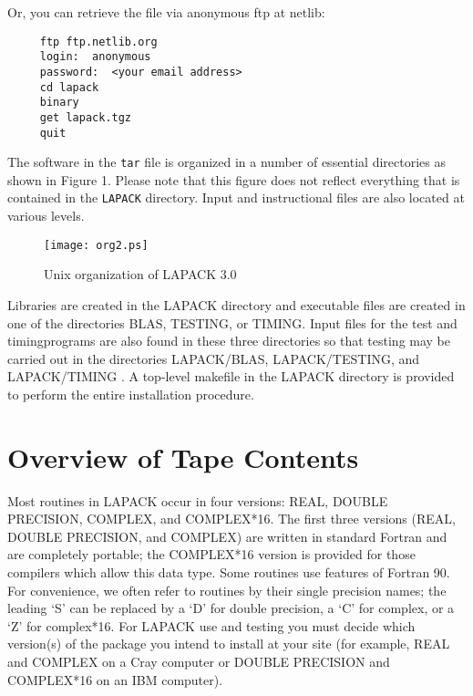 \documentclass[11pt]{report}
\begin{document}
Or, you can retrieve the file via anonymous ftp at netlib:

\begin{verbatim}
     ftp ftp.netlib.org
     login:  anonymous
     password:  <your email address>
     cd lapack
     binary
     get lapack.tgz
     quit
\end{verbatim}

The software in the \texttt{tar} file
is organized in a number of essential directories as shown
in Figure 1.  Please note that this figure does not reflect everything
that is contained in the \texttt{LAPACK} directory.  Input and instructional
files are also located at various levels.
\begin{figure}
\vspace{11pt}
\centerline{\texttt{[image: org2.ps]}}
\caption{Unix organization of LAPACK 3.0}
\vspace{11pt}
\end{figure}
Libraries are created in the LAPACK directory and 
executable files are created in one of the directories BLAS, TESTING,
or TIMING\footnotemark[\value{footnote}].  Input files for the test and 
timing\footnotemark[\value{footnote}]  programs are also
found in these three directories so that testing may be carried out
in the directories LAPACK/BLAS, LAPACK/TESTING, and LAPACK/TIMING \footnotemark[\value{footnote}].
A top-level makefile in the LAPACK directory is provided to perform the 
entire installation procedure.

\section{Overview of Tape Contents}\label{overview}

Most routines in LAPACK occur in four versions: REAL,
DOUBLE PRECISION, COMPLEX, and COMPLEX*16.
The first three versions (REAL, DOUBLE PRECISION, and COMPLEX)
are written in standard Fortran and are completely portable;
the COMPLEX*16 version is provided for
those compilers which allow this data type.
Some routines use features of Fortran 90.
For convenience, we often refer to routines by their single precision
names; the leading `S' can be replaced by a `D' for double precision,
a `C' for complex, or a `Z' for complex*16.  
For LAPACK use and testing you must decide which version(s)
of the package you intend to install at your site (for example,
REAL and COMPLEX on a Cray computer or DOUBLE PRECISION and
COMPLEX*16 on an IBM computer).
\end{document}
